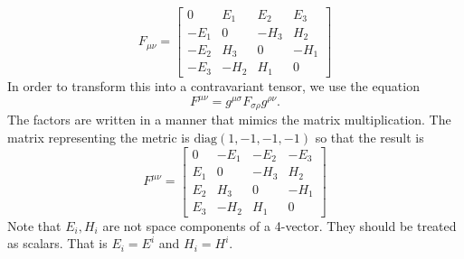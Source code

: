 \begin{enumerate}
\begin{equation}
F_{\mu\nu} = 
\begin{bmatrix}
0 & E_1 & E_2 & E_3 \\
-E_1 & 0 & -H_3 & H_2\\
-E_2 & H_3 & 0 & -H_1\\
-E_3 & -H_2 & H_1 & 0
\end{bmatrix}
\end{equation}
In order to transform this into a contravariant tensor, we use the equation
\begin{equation}\label{c3e76}
F^{\mu\nu} = g^{\mu\sigma}F_{\sigma\rho}g^{\rho\nu}.
\end{equation}
The factors are written in a manner that mimics the matrix multiplication. The matrix
representing the metric is $\text{diag}(1, -1, -1, -1)$ so that the result is
\begin{equation}\label{c3e77}
F^{\mu\nu} = 
\begin{bmatrix}
0 & -E_1 & -E_2 & -E_3 \\
E_1 & 0 & -H_3 & H_2\\
E_2 & H_3 & 0 & -H_1\\
E_3 & -H_2 & H_1 & 0
\end{bmatrix}
\end{equation}
Note that $E_i, H_i$ are not space components of a 4-vector. They should be treated
as scalars. That is $E_i = E^i$ and $H_i = H^i$.



\end{enumerate}
